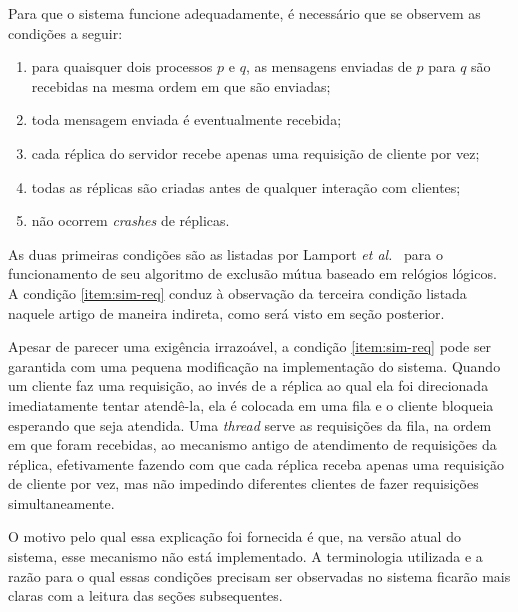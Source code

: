 \documentclass[../main.tex]{subfiles}
\begin{document}
Para que o sistema funcione adequadamente, é necessário que se observem as condições a seguir:

\begin{enumerate}
  \item
    para quaisquer dois processos $p$ e $q$, as mensagens enviadas de $p$ para $q$ são recebidas na mesma ordem em que são enviadas;

  \item
    toda mensagem enviada é eventualmente recebida;

  \item \label{item:sim-req}
    cada réplica do servidor recebe apenas uma requisição de cliente por vez;

  \item
    todas as réplicas são criadas antes de qualquer interação com clientes;

  \item
    não ocorrem \textit{crashes} de réplicas.
\end{enumerate}

As duas primeiras condições são as listadas por Lamport \textit{et al.}~\cite{lamport-logical-clocks} para o funcionamento de seu algoritmo de exclusão mútua baseado em relógios lógicos.
A condição \ref{item:sim-req} conduz à observação da terceira condição listada naquele artigo de maneira indireta, como será visto em seção posterior.

Apesar de parecer uma exigência irrazoável, a condição \ref{item:sim-req} pode ser garantida com uma pequena modificação na implementação do sistema.
Quando um cliente faz uma requisição, ao invés de a réplica ao qual ela foi direcionada imediatamente tentar atendê-la, ela é colocada em uma fila e o cliente bloqueia esperando que seja atendida.
Uma \textit{thread} serve as requisições da fila, na ordem em que foram recebidas, ao mecanismo antigo de atendimento de requisições da réplica, efetivamente fazendo com que cada réplica receba apenas uma requisição de cliente por vez, mas não impedindo diferentes clientes de fazer requisições simultaneamente.

O motivo pelo qual essa explicação foi fornecida é que, na versão atual do sistema, esse mecanismo não está implementado.
A terminologia utilizada e a razão para o qual essas condições precisam ser observadas no sistema ficarão mais claras com a leitura das seções subsequentes.
\end{document}
